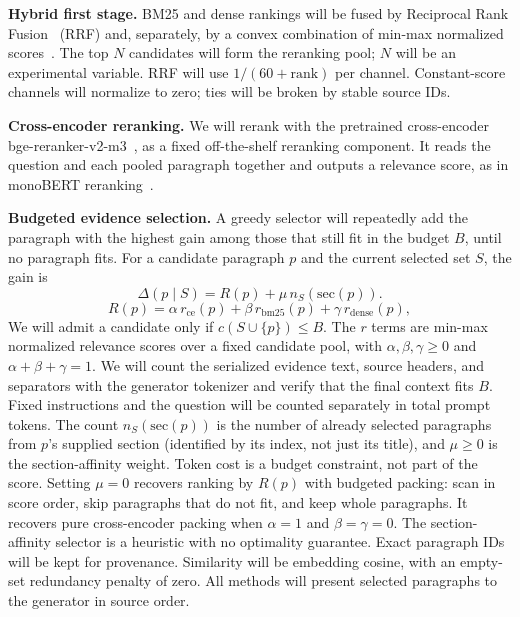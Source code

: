 \documentclass[sigconf, nonacm]{acmart}
\newcommand{\minihead}[1]{{\noindent\textbf{#1.} }}
\begin{document}
\minihead{Hybrid first stage} BM25 and dense rankings will be fused by Reciprocal Rank Fusion~\cite{cormack2009rrf} (RRF) and, separately, by a convex combination of min-max normalized scores~\cite{bruch2023fusion}. The top $N$ candidates will form the reranking pool; $N$ will be an experimental variable. RRF will use $1/(60+\mathrm{rank})$ per channel. Constant-score channels will normalize to zero; ties will be broken by stable source IDs.

\minihead{Cross-encoder reranking} We will rerank with the pretrained cross-encoder bge-reranker-v2-m3~\cite{bgererankercard}, as a fixed off-the-shelf reranking component. It reads the question and each pooled paragraph together and outputs a relevance score, as in monoBERT reranking~\cite{nogueira2019bert}.

\minihead{Budgeted evidence selection} A greedy selector will repeatedly add the paragraph with the highest gain among those that still fit in the budget $B$, until no paragraph fits. For a candidate paragraph $p$ and the current selected set $S$, the gain is
\begin{equation}
\Delta(p \mid S) = R(p) + \mu\, n_S(\mathrm{sec}(p)).
\label{eq:gain}
\end{equation}
\begin{equation*}
R(p) = \alpha\, r_{\mathrm{ce}}(p) + \beta\, r_{\mathrm{bm25}}(p) + \gamma\, r_{\mathrm{dense}}(p),
\end{equation*}
We will admit a candidate only if $c(S\cup\{p\})\leq B$. The $r$ terms are min-max normalized relevance scores over a fixed candidate pool, with $\alpha,\beta,\gamma\geq0$ and $\alpha+\beta+\gamma=1$. We will count the serialized evidence text, source headers, and separators with the generator tokenizer and verify that the final context fits $B$. Fixed instructions and the question will be counted separately in total prompt tokens. The count $n_S(\mathrm{sec}(p))$ is the number of already selected paragraphs from $p$'s supplied section (identified by its index, not just its title), and $\mu \ge 0$ is the section-affinity weight. Token cost is a budget constraint, not part of the score. Setting $\mu=0$ recovers ranking by $R(p)$ with budgeted packing: scan in score order, skip paragraphs that do not fit, and keep whole paragraphs. It recovers pure cross-encoder packing when $\alpha=1$ and $\beta=\gamma=0$. The section-affinity selector is a heuristic with no optimality guarantee. Exact paragraph IDs will be kept for provenance. Similarity will be embedding cosine, with an empty-set redundancy penalty of zero. All methods will present selected paragraphs to the generator in source order.
\end{document}
